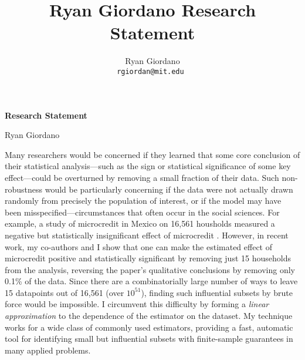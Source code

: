 
\usepackage{enumitem}

\usepackage{geometry}
\geometry{top=1.0in}
\geometry{left=1.1in}
\geometry{right=1.1in}

\title{Ryan Giordano Research Statement}

\author{
  Ryan Giordano \\ \texttt{rgiordan@mit.edu }
}



\begin{minipage}[t]{0.5\textwidth}
\hspace{-2em} %
{\bf \LARGE Research Statement}\\
\end{minipage}
\begin{minipage}[t]{0.5\textwidth}
        \hspace{8em} %
        {\LARGE Ryan Giordano}
\end{minipage}

Many researchers would be concerned if they learned that some core conclusion of
their statistical analysis---such as the sign or statistical significance of
some key effect---could be overturned by removing a small fraction of their
data. Such non-robustness would be particularly concerning if the data were not
actually drawn randomly from precisely the population of interest, or if the
model may have been misspecified---circumstances that often occur in the social
sciences. For example, a study of microcredit in Mexico on 16,561 housholds
measured a negative but statistically insignificant effect of microcredit
\citep{angelucci:2015:microcredit}.  However, in recent work, my co-authors and
I show that one can make the estimated effect of microcredit positive and
statistically significant by removing just 15 households from the analysis,
reversing the paper's qualitative conclusions by removing only 0.1\% of the
data.  Since there are a combinatorially large number of ways to leave 15
datapoints out of 16,561 (over $10^{51}$), finding such influential subsets by
brute force would be impossible.  I circumvent this difficulty by forming a
\emph{linear approximation} to the dependence of the estimator on the dataset.
My technique works for a wide class of commonly used estimators, providing a
fast, automatic tool for identifying small but influential subsets with
finite-sample guarantees in many applied problems.

